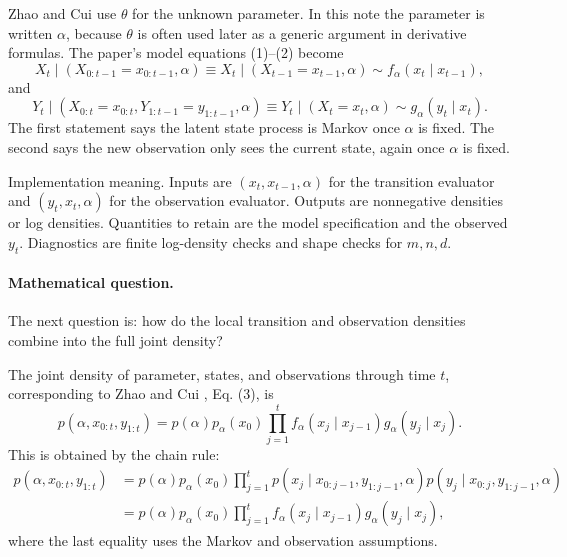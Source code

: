 \documentclass[11pt]{article}
\numberwithin{equation}{section}
\begin{document}
Zhao and Cui \cite{zhao2024ttsequential} use \(\theta\) for the unknown parameter.  In this note the parameter
is written \(\alpha\), because \(\theta\) is often used later as a generic
argument in derivative formulas.  The paper's model equations (1)--(2) become
\begin{equation}
    X_t\mid (X_{0:t-1}=x_{0:t-1},\alpha)
    \equiv
    X_t\mid (X_{t-1}=x_{t-1},\alpha)
    \sim f_\alpha(x_t\mid x_{t-1}),
    \label{eq:p24-bf-1}
\end{equation}
and
\begin{equation}
    Y_t\mid (X_{0:t}=x_{0:t},Y_{1:t-1}=y_{1:t-1},\alpha)
    \equiv
    Y_t\mid (X_t=x_t,\alpha)
    \sim g_\alpha(y_t\mid x_t).
    \label{eq:p24-bf-2}
\end{equation}
The first statement says the latent state process is Markov once \(\alpha\) is
fixed.  The second says the new observation only sees the current state, again
once \(\alpha\) is fixed.

Implementation meaning. Inputs are \((x_t,x_{t-1},\alpha)\)
for the transition evaluator and \((y_t,x_t,\alpha)\) for the observation
evaluator.  Outputs are nonnegative densities or log densities.  Quantities to
retain are the model specification and the observed \(y_t\).  Diagnostics are
finite log-density checks and shape checks for \(m,n,d\).

\paragraph{Mathematical question.}
The next question is: how do the local transition and observation densities
combine into the full joint density?

The joint density of parameter, states, and observations through time \(t\),
corresponding to Zhao and Cui \cite{zhao2024ttsequential}, Eq. (3), is
\begin{equation}
    p(\alpha,x_{0:t},y_{1:t})
    =
    p(\alpha)p_\alpha(x_0)
    \prod_{j=1}^{t}
    f_\alpha(x_j\mid x_{j-1})g_\alpha(y_j\mid x_j).
    \label{eq:p24-bf-3}
\end{equation}
This is obtained by the chain rule:
\[
\begin{aligned}
 p(\alpha,x_{0:t},y_{1:t})
 &=
 p(\alpha)p_\alpha(x_0)
 \prod_{j=1}^t
 p(x_j\mid x_{0:j-1},y_{1:j-1},\alpha)
 p(y_j\mid x_{0:j},y_{1:j-1},\alpha)\\
 &=
 p(\alpha)p_\alpha(x_0)
 \prod_{j=1}^t
 f_\alpha(x_j\mid x_{j-1})g_\alpha(y_j\mid x_j),
\end{aligned}
\]
where the last equality uses the Markov and observation assumptions.
\end{document}
